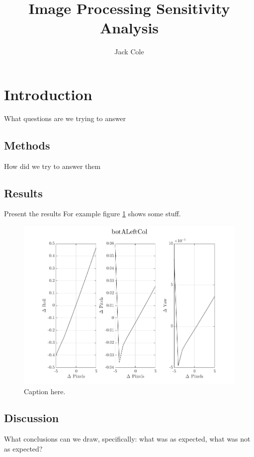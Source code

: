 \documentclass[12pt]{article}
\title{Image Processing Sensitivity Analysis}
\author{Jack Cole}
\date{}
\begin{document}
\maketitle
\section{Introduction}
What questions are we trying to answer
\subsection{Methods}
How did we try to answer them
\subsection{Results}
Present the results
For example figure \ref{fig:botALeftCol} shows some stuff.
\begin{figure}[H]
	\includegraphics[width=0.9\columnwidth]{botALeftCol.png}
	\caption{Caption here.\label{fig:botALeftCol}}
\end{figure}

\subsection{Discussion}
What conclusions can we draw, specifically: what was as expected, what was not as expected?
\end{document}
